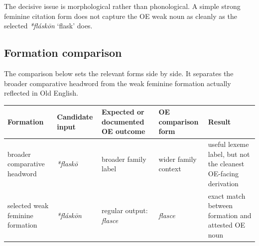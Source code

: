 \documentclass[
  british,
  a4paper,
  openany]{book}
\newcounter{none} %
\providecommand{\Recon}[1]{\emph{*#1}}
{\catcode`→=\active \global\def→{\ensuremath{\rightarrow}}}
\providecommand{\Recon}[1]{\emph{*#1}}
{\catcode`→=\active \global\def→{\ensuremath{\rightarrow}}}
\begin{document}
The decisive issue is morphological rather than phonological. A simple
strong feminine citation form does not capture the OE weak noun as
cleanly as the selected \Recon{fláskōn} `flask' does.

\subsection{Formation comparison}\label{formation-comparison-2}

The comparison below sets the relevant forms side by side. It separates
the broader comparative headword from the weak feminine formation
actually reflected in Old English.

{\def\LTcaptype{none} %
\begin{longtable}[]{@{}
  >{\raggedright\arraybackslash}p{}
  >{\raggedright\arraybackslash}p{}
  >{\raggedright\arraybackslash}p{}
  >{\raggedright\arraybackslash}p{}
  >{\raggedright\arraybackslash}p{}@{}}
\toprule\noalign{}
\begin{minipage}[b]{\linewidth}\raggedright
Formation
\end{minipage} & \begin{minipage}[b]{\linewidth}\raggedright
Candidate input
\end{minipage} & \begin{minipage}[b]{\linewidth}\raggedright
Expected or documented OE outcome
\end{minipage} & \begin{minipage}[b]{\linewidth}\raggedright
OE comparison form
\end{minipage} & \begin{minipage}[b]{\linewidth}\raggedright
Result
\end{minipage} \\
\midrule\noalign{}
\endhead
\bottomrule\noalign{}
\endlastfoot
broader comparative headword & {\emph{*flaskō}} & broader family label &
wider family context & useful lexeme label, but not the cleanest
OE-facing derivation \\
selected weak feminine formation & {\emph{*fláskōn}} & regular output:
{\emph{flasce}} & {\emph{flasce}} & exact match between formation and
attested OE noun \\
\end{longtable}
}
\end{document}
